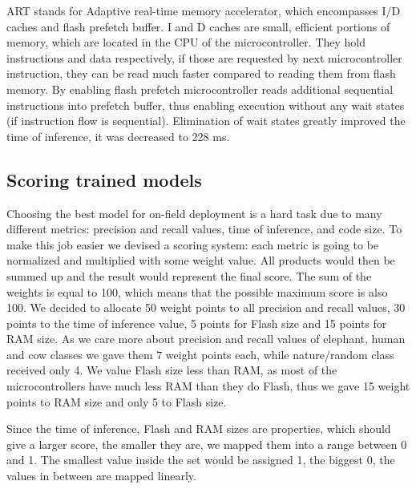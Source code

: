 ART stands for Adaptive real-time memory accelerator, which encompasses I/D caches and flash prefetch buffer.
I and D caches are small, efficient portions of memory, which are located in the CPU of the microcontroller.
They hold instructions and data respectively, if those are requested by next microcontroller instruction, they can be read much faster compared to reading them from flash memory. 
By enabling flash prefetch microcontroller reads additional sequential instructions into prefetch buffer, thus enabling execution without any wait states (if instruction flow is sequential).
Elimination of wait states greatly improved the time of inference, it was decreased to 228 \si{\milli\second}.


\subsection{ Scoring trained models}\label{scoring_models}

Choosing the best model for on-field deployment is a hard task due to many different metrics: precision and recall values, time of inference, and code size.
To make this job easier we devised a scoring system: each metric is going to be normalized and multiplied with some weight value.
All products would then be summed up and the result would represent the final score.
The sum of the weights is equal to 100, which means that the possible maximum score is also 100.
We decided to allocate 50 weight points to all precision and recall values, 30 points to the time of inference value, 5 points for Flash size and 15 points for RAM size.
As we care more about precision and recall values of elephant, human and cow classes we gave them 7 weight points each, while nature/random class received only 4.
We value Flash size less than RAM, as most of the microcontrollers have much less RAM than they do Flash, thus we gave 15 weight points to RAM size and only 5 to Flash size.

Since the time of inference, Flash and RAM sizes are properties, which should give a larger score, the smaller they are, we mapped them into a range between 0 and 1.
The smallest value inside the set would be assigned 1, the biggest 0, the values in between are mapped linearly.

